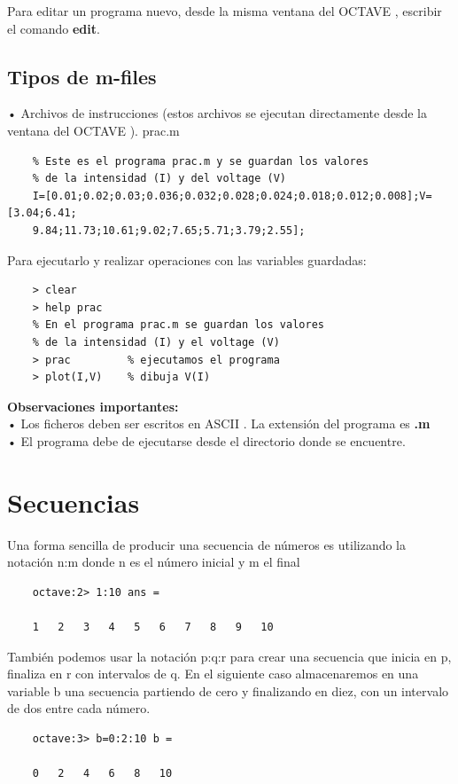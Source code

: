 \documentclass[a4,12pt]{article}
\begin{document}
Para editar un programa nuevo, desde la misma ventana del OCTAVE , escribir el comando \textbf{edit}.

\subsection{Tipos de m-files}

• Archivos de instrucciones (estos archivos se ejecutan directamente desde la ventana del OCTAVE ). prac.m
\begin{verbatim}
    % Este es el programa prac.m y se guardan los valores
    % de la intensidad (I) y del voltage (V)
    I=[0.01;0.02;0.03;0.036;0.032;0.028;0.024;0.018;0.012;0.008];V=[3.04;6.41;
    9.84;11.73;10.61;9.02;7.65;5.71;3.79;2.55];
\end{verbatim}

Para ejecutarlo y realizar operaciones con las variables guardadas:
\begin{verbatim}
    > clear
    > help prac
    % En el programa prac.m se guardan los valores
    % de la intensidad (I) y el voltage (V)
    > prac         % ejecutamos el programa
    > plot(I,V)    % dibuja V(I)
\end{verbatim}

\textbf{Observaciones importantes:}\\
• Los ficheros deben ser escritos en ASCII . La extensión del programa es \textbf{.m}\\
• El programa debe de ejecutarse desde el directorio donde se encuentre.

\section{Secuencias}

Una forma sencilla de producir una secuencia de números es utilizando la notación n:m
donde n es el número inicial y m el final

\begin{verbatim}
	octave:2> 1:10 ans =

	1	2	3	4	5	6	7	8	9	10
\end{verbatim}

También podemos usar la notación p:q:r para crear una secuencia que inicia en p, finaliza en r con intervalos de q. En el siguiente caso almacenaremos en una variable b una secuencia partiendo de cero y finalizando en diez, con un intervalo de dos entre cada número.

\begin{verbatim}
	octave:3> b=0:2:10 b =

	0	2	4	6	8	10
\end{verbatim}
\end{document}
